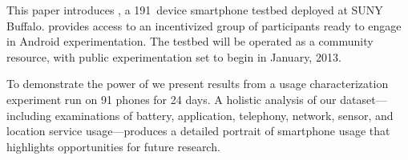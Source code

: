 
This paper introduces \PhoneLab{}, a 191~device smartphone testbed deployed
at SUNY Buffalo. \PhoneLab{} provides access to an incentivized group of
participants ready to engage in Android experimentation. The testbed will be
operated as a community resource, with public experimentation set to begin in
January, 2013.

To demonstrate the power of \PhoneLab{} we present results from a usage
characterization experiment run on 91 phones for 24 days. A holistic analysis
of our dataset---including examinations of battery, application, telephony,
network, sensor, and location service usage---produces a detailed portrait of
smartphone usage that highlights opportunities for future research.
